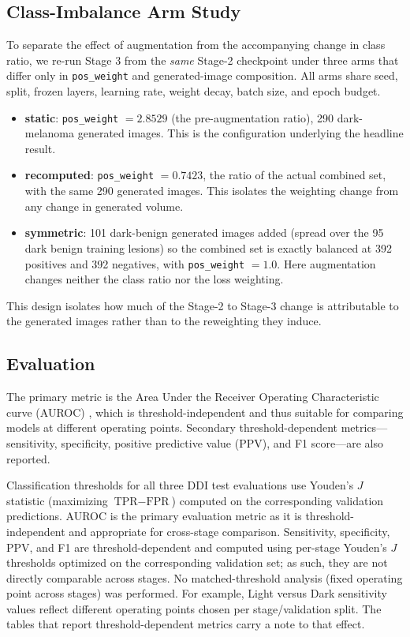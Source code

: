 \subsection{Class-Imbalance Arm Study}
\label{sec:pw_arms}

To separate the effect of augmentation from the accompanying change in class ratio, we re-run Stage 3 from the \emph{same} Stage-2 checkpoint under three arms that differ only in \texttt{pos\_weight} and generated-image composition. All arms share seed, split, frozen layers, learning rate, weight decay, batch size, and epoch budget.

\begin{itemize}
    \item \textbf{static}: \texttt{pos\_weight} $= 2.8529$ (the pre-augmentation ratio), 290 dark-melanoma generated images. This is the configuration underlying the headline result.
    \item \textbf{recomputed}: \texttt{pos\_weight} $= 0.7423$, the ratio of the actual combined set, with the same 290 generated images. This isolates the weighting change from any change in generated volume.
    \item \textbf{symmetric}: 101 dark-benign generated images added (spread over the 95 dark benign training lesions) so the combined set is exactly balanced at 392 positives and 392 negatives, with \texttt{pos\_weight} $= 1.0$. Here augmentation changes neither the class ratio nor the loss weighting.
\end{itemize}

This design isolates how much of the Stage-2 to Stage-3 change is attributable to the generated images rather than to the reweighting they induce.

\subsection{Evaluation}

The primary metric is the Area Under the Receiver Operating Characteristic curve (AUROC) \cite{Hanley1982}, which is threshold-independent and thus suitable for comparing models at different operating points. Secondary threshold-dependent metrics---sensitivity, specificity, positive predictive value (PPV), and F1 score---are also reported.

Classification thresholds for all three DDI test evaluations use Youden's $J$ statistic (maximizing $\text{TPR} - \text{FPR}$) computed on the corresponding validation predictions. AUROC is the primary evaluation metric as it is threshold-independent and appropriate for cross-stage comparison. Sensitivity, specificity, PPV, and F1 are threshold-dependent and computed using per-stage Youden's $J$ thresholds optimized on the corresponding validation set; as such, they are not directly comparable across stages. No matched-threshold analysis (fixed operating point across stages) was performed. For example, Light versus Dark sensitivity values reflect different operating points chosen per stage/validation split. The tables that report threshold-dependent metrics carry a note to that effect.


